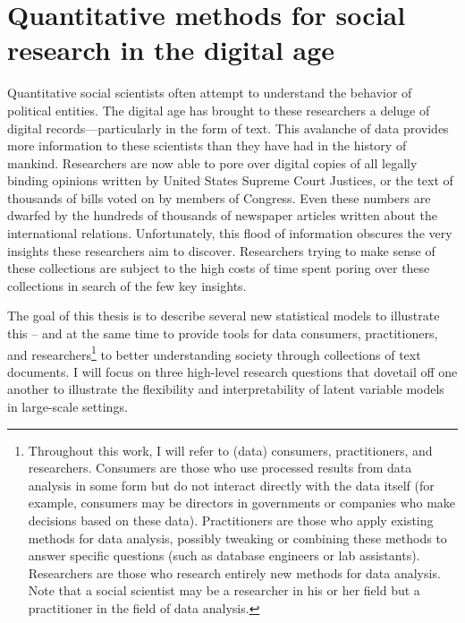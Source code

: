 \chapter{Quantitative methods for social research in the digital age}

Quantitative social scientists often attempt to understand the
behavior of political entities.  The digital age has brought to these
researchers a deluge of digital records---particularly in the form of
text.  This avalanche of data provides more information to these
scientists than they have had in the history of mankind.  Researchers
are now able to pore over digital copies of all legally binding
opinions written by United States Supreme Court Justices, or the text
of thousands of bills voted on by members of Congress.  Even these
numbers are dwarfed by the hundreds of thousands of newspaper articles
written about the international relations.  Unfortunately, this flood
of information obscures the very insights these researchers aim to
discover.  Researchers trying to make sense of these collections are
subject to the high costs of time spent poring over these collections
in search of the few key insights.

The goal of this thesis is to describe several new statistical models
to illustrate this -- and at the same time to provide tools for data
consumers, practitioners, and researchers\footnote{Throughout this
  work, I will refer to (data) consumers, practitioners, and
  researchers.  Consumers are those who use processed results from
  data analysis in some form but do not interact directly with the
  data itself (for example, consumers may be directors in governments
  or companies who make decisions based on these data).  Practitioners
  are those who apply existing methods for data analysis, possibly
  tweaking or combining these methods to answer specific questions
  (such as database engineers or lab assistants). Researchers are
  those who research entirely new methods for data analysis.  Note
  that a social scientist may be a researcher in his or her field but
  a practitioner in the field of data analysis.} to better
understanding society through collections of text documents.  I will
focus on three high-level research questions that dovetail off one
another to illustrate the flexibility and interpretability of latent
variable models in large-scale settings.


